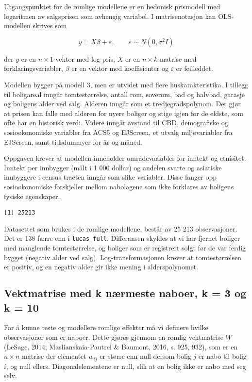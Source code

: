 \documentclass[
  norsk,
  a4paper,
]{article}
\begin{document}
Utgangspunktet for de romlige modellene er en hedonisk prismodell med
logaritmen av salgsprisen som avhengig variabel. I matrisenotasjon kan
OLS-modellen skrives som

\[y = X\beta + \varepsilon, \qquad \varepsilon \sim N(0, \sigma^2 I)\]

der \(y\) er en \(n \times 1\)-vektor med log pris, \(X\) er en
\(n \times k\)-matrise med forklaringsvariabler, \(\beta\) er en vektor
med koeffisienter og \(\varepsilon\) er feilleddet.

Modellen bygger på modell 3, men er utvidet med flere huskarakteristika.
I tillegg til boligareal inngår tomtestørrelse, antall rom, soverom, bad
og halvbad, garasje og boligens alder ved salg. Alderen inngår som et
tredjegradspolynom. Det gjør at prisen kan falle med alderen for nyere
boliger og stige igjen for de eldste, som ofte har en historisk verdi.
Videre inngår avstand til CBD, demografiske og sosioøkonomiske variabler
fra ACS5 og EJScreen, et utvalg miljøvariabler fra EJScreen, samt
tidsdummyer for år og måned.

Oppgaven krever at modellen inneholder områdevariabler for inntekt og
etnisitet. Inntekt per innbygger (målt i 1 000 dollar) og andelen svarte
og asiatiske innbyggere i census tracten inngår som slike variabler.
Disse fanger opp sosioøkonomiske forskjeller mellom nabolagene som ikke
forklares av boligens fysiske egenskaper.

\begin{verbatim}
[1] 25213
\end{verbatim}

Datasettet som brukes i de romlige modellene, består av 25 213
observasjoner. Det er 138 færre enn i \texttt{lucas\_full}. Differansen
skyldes at vi har fjernet boliger med manglende tomtestørrelse, og
boliger som er registrert solgt før de var ferdig bygget (negativ alder
ved salg). Log-transformasjonen krever at tomtestørrelsen er positiv, og
en negativ alder gir ikke mening i alderspolynomet.

\subsection{Vektmatrise med k nærmeste naboer, k = 3 og k =
10}\label{vektmatrise-med-k-nuxe6rmeste-naboer-k-3-og-k-10}

For å kunne teste og modellere romlige effekter må vi definere hvilke
observasjoner som er naboer. Dette gjøres gjennom en romlig vektmatrise
\(W\) (LeSage, 2014; Maslianskaia-Pautrel \& Baumont, 2016, s. 925,
932), som er en \(n \times n\)-matrise der elementet \(w_{ij}\) er
større enn null dersom bolig \(j\) er nabo til bolig \(i\), og null
ellers. Diagonalelementene er null, slik at en bolig ikke er nabo med
seg selv.
\end{document}
